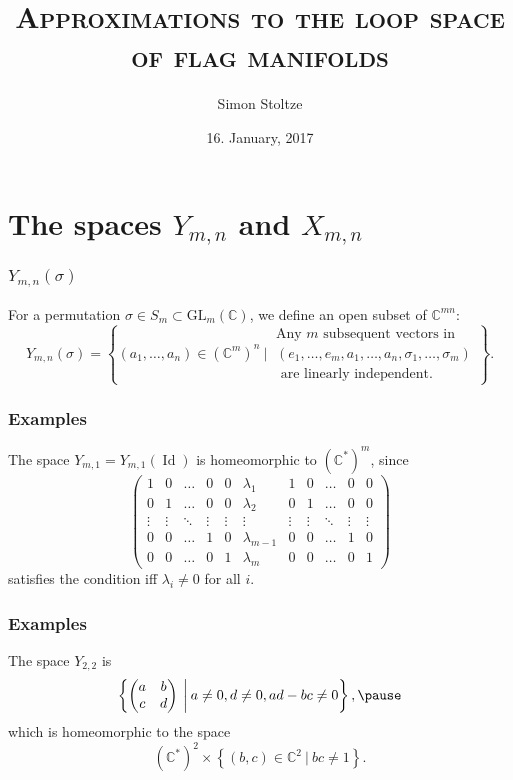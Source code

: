 \documentclass{beamer} %
\author{Simon Stoltze}
\date{16. January, 2017}
\title[The loop space of flag manifolds]{\textsc{Approximations to the loop space of flag manifolds}}
\institute[IMF]{Institut for Matematik\\Aarhus University}
\newcommand{\C}{\mathbb{C}}
\newcommand{\delim}{\:}
\newcommand{\GL}{\mathrm{GL}}
\DeclareMathOperator{\Id}{Id}
\newcommand{\set}[1]{\left\{ #1 \right\}}
\renewcommand{\l}{\lambda}
\begin{document}
\begin{frame}
  \titlepage
\end{frame}

\section{The spaces $Y_{m,n}$ and $X_{m,n}$}

\begin{frame}
  \frametitle{$Y_{m,n}(\sigma)$}
  \begin{definition}
    For a permutation $\sigma\in S_m\subset \GL_m(\C)$, we define an
    open subset of $\C^{mn}$:
    \[ Y_{m,n}(\sigma) = \set{(a_1,\dots,a_n) \in (\C^m)^n
        \delim\Bigg\vert\delim
        \begin{matrix}
          \text{Any } m \text{ subsequent vectors in } \\
          (e_1,\dots,e_m,a_1,\dots,a_n,\sigma_1,\dots,\sigma_m) \\
          \text{ are linearly independent.}
        \end{matrix} }. \]
  \end{definition}
\end{frame}

\begin{frame}
  \frametitle{Examples}
  \begin{example}
    The space $Y_{m,1}=Y_{m,1}(\Id)$ is homeomorphic to $(\C^*)^m$,
    since
    \[ \begin{pmatrix}
      1&0&\dots&0&0&\l_1&1&0&\dots&0&0 \\
      0&1&\dots&0&0&\l_2&0&1&\dots&0&0 \\
      \vdots&\vdots&\ddots&\vdots&\vdots&\vdots&\vdots&\vdots&\ddots&\vdots&\vdots
      \\
      0&0&\dots&1&0&\l_{m-1}&0&0&\dots&1&0 \\
      0&0&\dots&0&1&\l_m&0&0&\dots&0&1
    \end{pmatrix} \]
    satisfies the condition iff $\l_i \neq 0$ for all $i$.
  \end{example}
\end{frame}

\begin{frame}
  \frametitle{Examples}
  \begin{example}
    The space $Y_{2,2}$ is
    \[ \set{
      \begin{pmatrix}
        a & b \\
        c & d
      \end{pmatrix} \delim\bigg\vert\delim a \neq 0, d \neq 0, ad-bc
      \neq 0 }, \pause \]
    which is homeomorphic to the space
    \[ (\C^*)^2 \times \set{(b,c)\in\C^2 \delim\vert\delim
      bc \neq 1}. \]
  \end{example}
\end{frame}
\end{document}
